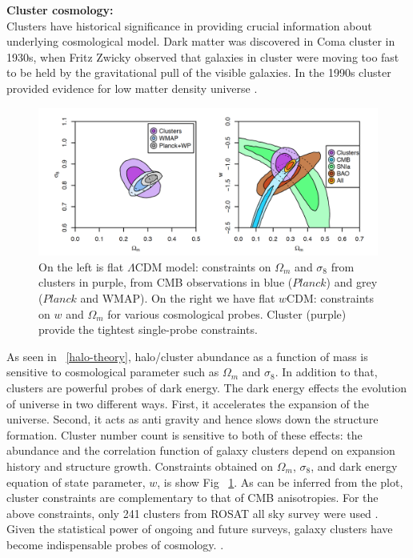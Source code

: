 \textbf{Cluster cosmology:}\\
Clusters have historical significance in providing crucial information about underlying cosmological model. Dark matter was discovered in Coma cluster in 1930s, when Fritz Zwicky observed that galaxies in cluster were moving too fast to be held by the gravitational pull of the visible galaxies. In the 1990s cluster provided evidence for low matter density universe \cite{white93a}. %
\begin{figure}[ht]
\includegraphics[width = \columnwidth]{figs/cosmology.png}
\caption{On the left is flat $\Lambda$CDM model: constraints on $\Omega_{m}$ and $\sigma_{8}$ from clusters in purple, from CMB observations in blue ($Planck$) and grey ($Planck$ and WMAP). On the right we have flat $w$CDM: constraints on $w$ and $\Omega_{m}$ for various cosmological probes. Cluster (purple) provide the tightest single-probe constraints.  }
\label{clustercosmology}
\end{figure}

As seen in ~\ref{halo-theory}, halo/cluster abundance as a function of mass is sensitive to cosmological parameter such as $\Omega_{m}$ and $\sigma_{8}$. In addition to that, clusters are powerful probes of dark energy. The dark energy effects the evolution of universe in two different ways. 
First, it accelerates the expansion of the universe. Second, it acts as anti gravity and hence slows down the structure formation. Cluster number count is sensitive to both of these effects: the abundance and the correlation function of galaxy clusters depend on expansion history and structure growth. 
Constraints obtained on $\Omega_{m}$, $\sigma_{8}$, and dark energy equation of state parameter, $w$, is show Fig ~\ref{clustercosmology}.
As can be inferred from the plot, cluster constraints are complementary to that of CMB anisotropies. For the above constraints, only 241 clusters from ROSAT all sky survey were used \cite{mantz15}. Given the statistical power of ongoing and future surveys, galaxy clusters have become indispensable probes of cosmology. \cite{so18,benson14}. %

